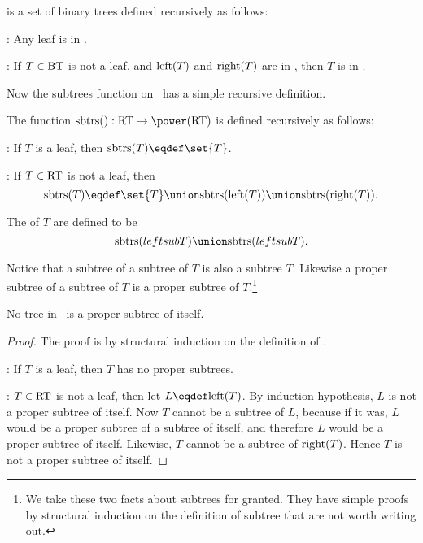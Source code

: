 \iffalse
This abstract setup also allows some weird ``circular'' trees which
are proper subtrees of themselves.  Fortunately, all we need are the
recursively defined binary trees \rectree\ where all this weirdness
gets ruled out.
\fi

\begin{definition}
\rectree is a set of binary trees defined recursively as follows:

:  Any leaf is in \rectree.

: If $T \in \text{BT}$ is not a leaf,
and $\text{left}(T)$ and $\text{right}(T)$ are in \rectree, then $T$ is in
\rectree.
\end{definition}

Now the subtrees function on \rectree\ has a simple recursive
definition.

\begin{definition}
The function $\subtrees{}: \rectree \to \power(\rectree)$ is defined recursively as follows:

: If $T$ is a leaf, then $\subtrees{T} \eqdef
\set{T}$.

: If $T \in \text{RT}$ is not a leaf,
then
\[
\subtrees{T} \eqdef \set{T} \union \subtrees{\leftsub{T}} \union
\subtrees{\rightsub{T}}.
\]

The  of $T$ are defined to be
\[
\subtrees{leftsub{T}} \union \subtrees{leftsub{T}}.
\]
\end{definition}

Notice that a subtree of a subtree of $T$ is also a subtree $T$.
Likewise a proper subtree of a subtree of $T$ is a proper subtree of
$T$.\footnote{We take these two facts about subtrees for granted.
  They have simple proofs by structural induction on the definition of
  subtree that are not worth writing out.}

\begin{lemma}\label{}
No tree in \rectree\ is a proper subtree of itself.
\end{lemma}

\begin{proof}
The proof is by structural induction on the definition of \rectree.

: If $T$ is a leaf, then $T$ has no proper
subtrees.

: $T \in \text{RT}$ is not a leaf, then
let $L \eqdef \leftsub{T}$.  By induction hypothesis, $L$ is not a
proper subtree of itself.  Now $T$ cannot be a subtree of $L$, because
if it was, $L$ would be a proper subtree of a subtree of itself, and
therefore $L$ would be a proper subtree of itself.  Likewise, $T$
cannot be a subtree of $\text{right}(T)$.  Hence $T$ is not a proper
subtree of itself.
\end{proof}

